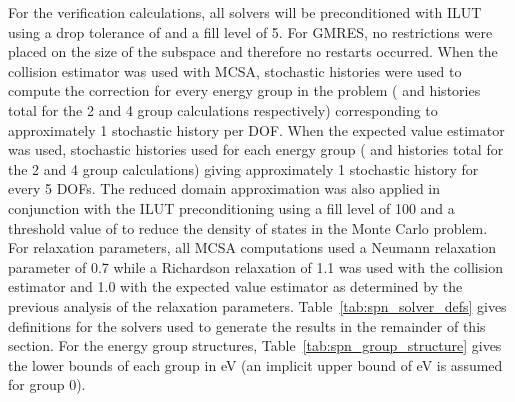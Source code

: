 For the verification calculations, all solvers will be preconditioned
with ILUT using a drop tolerance of  and a fill level of
5. For GMRES, no restrictions were placed on the size of the subspace
and therefore no restarts occurred. When the collision estimator was
used with MCSA,  stochastic histories were used to compute
the correction for every energy group in the problem ( and
 histories total for the 2 and 4 group calculations
respectively) corresponding to approximately 1 stochastic history per
DOF. When the expected value estimator was used,  stochastic
histories used for each energy group ( and 
histories total for the 2 and 4 group calculations) giving
approximately 1 stochastic history for every 5 DOFs. The reduced
domain approximation was also applied in conjunction with the ILUT
preconditioning using a fill level of 100 and a threshold value of
 to reduce the density of states in the Monte Carlo
problem. For relaxation parameters, all MCSA computations used a
Neumann relaxation parameter of 0.7 while a Richardson relaxation of
1.1 was used with the collision estimator and 1.0 with the expected
value estimator as determined by the previous analysis of the
relaxation parameters. Table~\ref{tab:spn_solver_defs} gives
definitions for the solvers used to generate the results in the
remainder of this section. For the energy group structures,
Table~\ref{tab:spn_group_structure} gives the lower bounds of each
group in eV (an implicit upper bound of  eV is assumed for
group 0).
